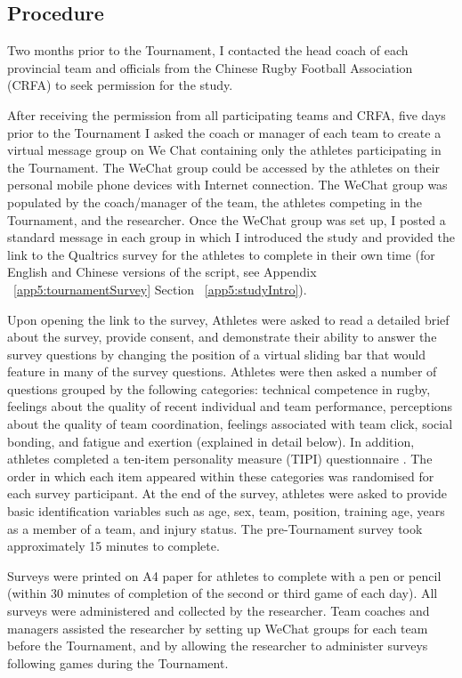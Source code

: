 \subsection{Procedure}

Two months prior to the Tournament, I contacted the head coach of each provincial team and officials from the Chinese Rugby Football Association (CRFA) to seek permission for the study.

After receiving the permission from all participating teams and CRFA, five days prior to the Tournament I asked the coach or manager of each team to create a virtual message group on We Chat containing only the athletes participating in the Tournament. The WeChat group could be accessed by the athletes on their personal mobile phone devices with Internet connection. The WeChat group was populated by the coach/manager of the team, the athletes competing in the Tournament, and the researcher. Once the WeChat group was set up, I posted a standard message in each group in which I introduced the study and provided the link to the Qualtrics survey for the athletes to complete in their own time (for English and Chinese versions of the script, see Appendix ~\ref{app5:tournamentSurvey} Section ~\ref{app5:studyIntro}).

Upon opening the link to the survey, Athletes were asked to read a detailed brief about the survey, provide consent, and demonstrate their ability to answer the survey questions by changing the position of a virtual sliding bar that would feature in many of the survey questions. Athletes were then asked a number of questions grouped by the following categories: technical competence in rugby, feelings about the quality of recent individual and team performance, perceptions about the quality of team coordination, feelings associated with team click, social bonding, and fatigue and exertion (explained in detail below). In addition, athletes completed a ten-item personality measure (TIPI) questionnaire  \citep{Gosling2003}. The order in which each item appeared within these categories was randomised for each survey participant. At the end of the survey, athletes were asked to provide basic identification variables such as age, sex, team, position, training age, years as a member of a team, and injury status. The pre-Tournament survey took approximately 15 minutes to complete.



Surveys were printed on A4 paper for athletes to complete with a pen or pencil (within 30 minutes of completion of the second or third game of each day). All surveys were administered and collected by the researcher. Team coaches and managers assisted the researcher by setting up WeChat groups for each team before the Tournament, and by allowing the researcher to administer surveys following games during the Tournament.


